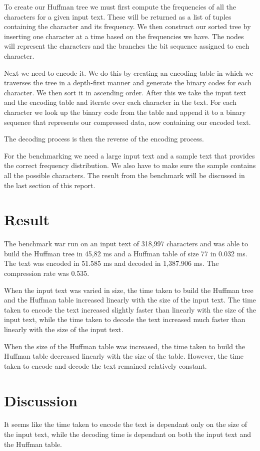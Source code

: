 \documentclass[a4paper,11pt]{article}
\begin{document}
To create our Huffman tree we must first compute the frequencies of all the characters for a given input text. These will be returned
as a list of tuples containing the character and its frequency. We then construct our sorted tree by inserting one character at a
time based on the frequencies we have. The nodes will represent the characters and the branches the bit sequence assigned to each
character.

Next we need to encode it. We do this by creating an encoding table in which we traverses the tree in a depth-first manner and
generate the binary codes for each character. We then sort it in ascending order. After this we take the input text and the encoding
table and iterate over each character in the text. For each character we look up the binary code from the table and append it to
a binary sequence that represents our compressed data, now containing our encoded text.

The decoding process is then the reverse of the encoding process.

For the benchmarking we need a large input text and a sample text that provides the correct frequency distribution. We also have
to make sure the sample contains all the possible characters. The result from the benchmark will be discussed in the last section
of this report.


\section*{Result}
The benchmark war run on an input text of 318,997 characters and was able to build the Huffman tree in 45,82 ms and a Huffman table
of size 77 in 0.032 ms. The text was encoded in 51.585 ms and decoded in 1,387.906 ms. The compression rate was 0.535.

When the input text was varied in size, the time taken to build the Huffman tree and the Huffman table increased linearly with
the size of the input text. The time taken to encode the text increased slightly faster than linearly with the size of the input
text, while the time taken to decode the text increased much faster than linearly with the size of the input text.

When the size of the Huffman table was increased, the time taken to build the Huffman table decreased linearly with the size of
the table. However, the time taken to encode and decode the text remained relatively constant.


\section*{Discussion}
It seems like the time taken to encode the text is dependant only on the size of the input text, while the decoding time is dependant
on both the input text and the Huffman table.
\end{document}

